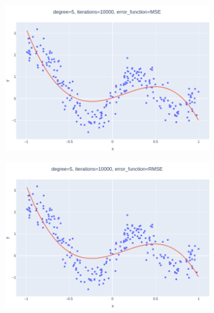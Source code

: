 \documentclass[14pt,a4]{article}
\begin{document}
\begin{figure}[h]
\begin{subfigure}{0.3\textwidth}
        \includegraphics[width=\textwidth]{images/implementation/q1/part_c/5_10000_MSE.png}
    \end{subfigure}
    \hfill
    \begin{subfigure}{0.3\linewidth}
        \centering
        \includegraphics[width=\textwidth]{images/implementation/q1/part_c/5_10000_RMSE.png}
    \end{subfigure}
    \newline
    \begin{subfigure}{0.3\linewidth}
        \centering

\end{subfigure}
\end{figure}
\end{document}
